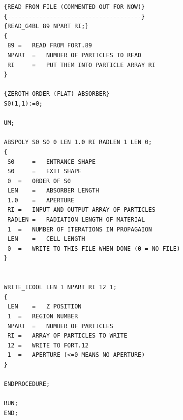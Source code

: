 \begin{lstlisting}
{READ FROM FILE (COMMENTED OUT FOR NOW)}
{--------------------------------------}
{READ_G4BL 89 NPART RI;}
{
 89	=	READ FROM FORT.89
 NPART	=	NUMBER OF PARTICLES TO READ
 RI 	=	PUT THEM INTO PARTICLE ARRAY RI
}

{ZEROTH ORDER (FLAT) ABSORBER}
S0(1,1):=0;

UM;

ABSPOLY S0 S0 0 LEN 1.0 RI RADLEN 1 LEN 0;
{
 S0 	=	ENTRANCE SHAPE
 S0 	=	EXIT SHAPE
 0	=	ORDER OF S0
 LEN	=	ABSORBER LENGTH
 1.0	=	APERTURE
 RI	=	INPUT AND OUTPUT ARRAY OF PARTICLES
 RADLEN	=	RADIATION LENGTH OF MATERIAL
 1 	=	NUMBER OF ITERATIONS IN PROPAGAION
 LEN	=	CELL LENGTH
 0	=	WRITE TO THIS FILE WHEN DONE (0 = NO FILE)
}
 

WRITE_ICOOL LEN 1 NPART RI 12 1;
{
 LEN	=	Z POSITION
 1	=	REGION NUMBER
 NPART	=	NUMBER OF PARTICLES
 RI	=	ARRAY OF PARTICLES TO WRITE
 12	=	WRITE TO FORT.12
 1	=	APERTURE (<=0 MEANS NO APERTURE)
}

ENDPROCEDURE;

RUN;
END;

\end{lstlisting}

\label{sec:cosyscript}

